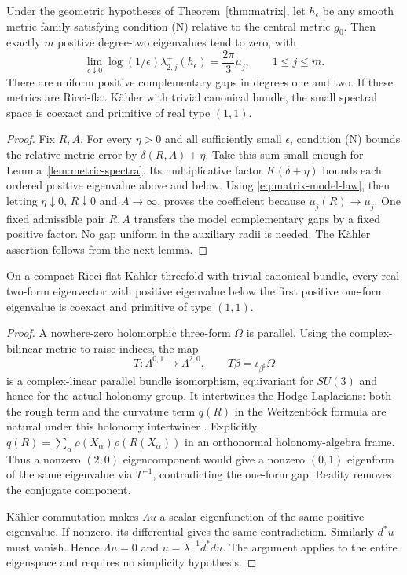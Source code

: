 \begin{theorem}
\label{thm:C0-spectrum}
Under the geometric hypotheses of Theorem~\ref{thm:matrix}, let
$h_\epsilon$ be any smooth metric family satisfying condition \textup{(N)}
relative to the central metric $g_0$. Then exactly $m$ positive degree-two
eigenvalues tend to zero, with
\[
 \lim_{\epsilon\downarrow0}\log(1/\epsilon)
             \lambda^+_{2,j}(h_\epsilon)=\frac{2\pi}{3}\mu_j,
 \qquad 1\le j\le m.
\]
There are uniform positive complementary gaps in degrees one and two.
If these metrics are Ricci-flat K\"ahler with trivial canonical bundle,
the small spectral space is coexact and primitive of real type $(1,1)$.
\end{theorem}
\begin{proof}
Fix $R,A$. For every $\eta>0$ and all sufficiently small $\epsilon$,
condition \textup{(N)} bounds the relative metric error by
$\delta(R,A)+\eta$. Take this sum small enough for
Lemma~\ref{lem:metric-spectra}. Its multiplicative factor
$K(\delta+\eta)$ bounds each ordered positive eigenvalue above and below.
Using \eqref{eq:matrix-model-law}, then letting $\eta\downarrow0$,
$R\downarrow0$ and $A\to\infty$, proves the coefficient because
$\mu_j(R)\to\mu_j$. One fixed admissible pair $R,A$ transfers the
model complementary gaps by a fixed positive factor. No gap uniform in
the auxiliary radii is needed. The K\"ahler assertion follows from the
next lemma.
\end{proof}

\begin{lemma}\label{lem:small-type}
On a compact Ricci-flat K\"ahler threefold with trivial canonical bundle,
every real two-form eigenvector with positive eigenvalue below the first
positive one-form eigenvalue is coexact and primitive of type $(1,1)$.
\end{lemma}
\begin{proof}
A nowhere-zero holomorphic three-form $\Omega$ is parallel. Using the
complex-bilinear metric to raise indices, the map
\[
 T:\Lambda^{0,1}\longrightarrow\Lambda^{2,0},\qquad
 T\beta=\iota_{\beta^\sharp}\Omega
\]
is a complex-linear parallel bundle isomorphism, equivariant for $SU(3)$
and hence for the actual holonomy group. It intertwines the Hodge
Laplacians: both the rough term and the curvature term $q(R)$ in the
Weitzenb\"ock formula are natural under this holonomy intertwiner
\cite[\S\S2.4, 2.6, Definition~2.4 and Example~1]{semmelmann-weingart}.
Explicitly, $q(R)=\sum_\alpha\rho(X_\alpha)\rho(R(X_\alpha))$ in an
orthonormal holonomy-algebra frame. Thus a nonzero $(2,0)$ eigencomponent
would give a nonzero $(0,1)$ eigenform of the same eigenvalue via $T^{-1}$,
contradicting the one-form gap. Reality removes the conjugate component.

K\"ahler commutation makes $\Lambda u$ a scalar eigenfunction of the
same positive eigenvalue. If nonzero, its differential gives the same
contradiction. Similarly $d^*u$ must vanish. Hence $\Lambda u=0$ and
$u=\lambda^{-1}d^*du$. The argument applies to the entire eigenspace and
requires no simplicity hypothesis.
\end{proof}

